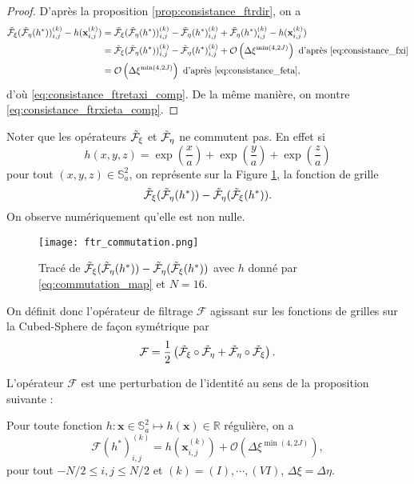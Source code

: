 \begin{proof}
D'après la proposition \ref{prop:consistance_ftrdir}, on a
\begin{align*}
\tilde{\mathcal{F}}_{\xi}(\tilde{\mathcal{F}}_{\eta} (h^*) )_{i,j}^{(k)} - h(\mathbf{x}_{i,j}^{(k)}) & = \tilde{\mathcal{F}}_{\xi}(\tilde{\mathcal{F}}_{\eta} (h^*) )_{i,j}^{(k)} - \tilde{\mathcal{F}}_{\eta}(h^*)_{i,j}^{(k)} + \tilde{\mathcal{F}}_{\eta}(h^*)_{i,j}^{(k)} - h(\mathbf{x}_{i,j}^{(k)})\\
	& = \tilde{\mathcal{F}}_{\xi}(\tilde{\mathcal{F}}_{\eta} (h^*) )_{i,j}^{(k)} - \tilde{\mathcal{F}}_{\eta}(h^*)_{i,j}^{(k)} + \mathcal{O} \left( \Delta \xi^{\min(4,2J)} \right) \text{ d'après \eqref{eq:consistance_fxi}}\\
	& = \mathcal{O} \left( \Delta \xi^{\min(4,2J)} \right) \text{ d'après \eqref{eq:consistance_feta}},
\end{align*}
d'où \eqref{eq:consistance_ftretaxi_comp}.
De la même manière, on montre \eqref{eq:consistance_ftrxieta_comp}.
\end{proof}

Noter que les opérateurs $\tilde{\mathcal{F}}_{\xi}$ et $\tilde{\mathcal{F}}_{\eta}$ ne commutent pas. En effet si 
\begin{equation}
h(x,y,z) = \exp \left( \dfrac{x}{a} \right) + \exp \left( \dfrac{y}{a} \right) + \exp \left( \dfrac{z}{a} \right)
\label{eq:commutation_map}
\end{equation}
pour tout $(x,y,z) \in \mathbb{S}_a^2$, on représente sur la Figure \ref{fig:commutation_map}, la fonction de grille
\begin{equation}
\tilde{\mathcal{F}}_{\xi} (\tilde{\mathcal{F}}_{\eta}(h^*))-\tilde{\mathcal{F}}_{\eta} (\tilde{\mathcal{F}}_{\xi}(h^*)).
\end{equation}
On observe numériquement qu'elle est non nulle.
\begin{figure}[htbp]
\begin{center}
\texttt{[image: ftr\_commutation.png]}
\end{center}
\caption{Tracé de $\tilde{\mathcal{F}}_{\xi} (\tilde{\mathcal{F}}_{\eta}(h^*))-\tilde{\mathcal{F}}_{\eta} (\tilde{\mathcal{F}}_{\xi} (h^*))$ avec $h$ donné par \eqref{eq:commutation_map} et $N=16$.}
\label{fig:commutation_map}
\end{figure}
On définit donc l'opérateur de filtrage $\mathcal{F}$ agissant sur les fonctions de grilles sur la Cubed-Sphere de façon symétrique par
\begin{equation}
\mathcal{F} = \dfrac{1}{2} \left( \tilde{\mathcal{F}}_{\xi} \circ \tilde{\mathcal{F}}_{\eta} + \tilde{\mathcal{F}}_{\eta} \circ \tilde{\mathcal{F}}_{\xi} \right).
\label{eq:operateur_filtrage}
\end{equation}

L'opérateur $\mathcal{F}$ est une perturbation de l'identité au sens de la proposition suivante :
\begin{proposition}
Pour toute fonction $h : \mathbf{x} \in \mathbb{S}_a^2 \mapsto h(\mathbf{x}) \in \mathbb{R}$ régulière, on a 
\begin{equation}
\mathcal{F}(h^*)_{i,j}^{(k)} = h(\mathbf{x}_{i,j}^{(k)}) + \mathcal{O}\left( \Delta \xi^{\min(4,2J)} \right),
\label{eq:operteur_filtrage_cons}
\end{equation}
pour tout $-N/2 \leq i,j \leq N/2$ et $(k) = (I), \cdots , (VI)$, $\Delta \xi = \Delta \eta$.
\end{proposition}

